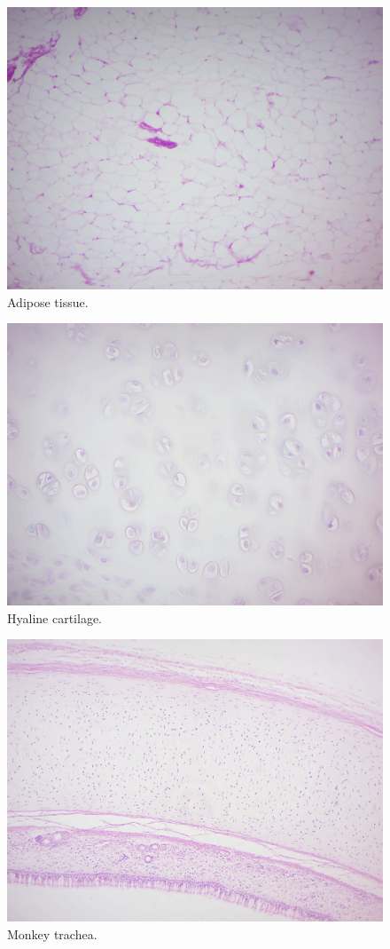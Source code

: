\begin{figure}

{\centering \includegraphics[width=0.7\linewidth]{./figures/tissues/adipose}

}

\caption{Adipose tissue.}\label{fig:adipose}
\end{figure}

\begin{figure}

{\centering \includegraphics[width=0.7\linewidth]{./figures/tissues/hyaline_cartilage}

}

\caption{Hyaline cartilage.}\label{fig:hyaline}
\end{figure}


\begin{figure}

{\centering \includegraphics[width=0.7\linewidth]{./figures/tissues/monkey_trachea}

}

\caption{Monkey trachea.}\label{fig:trachea}
\end{figure}


